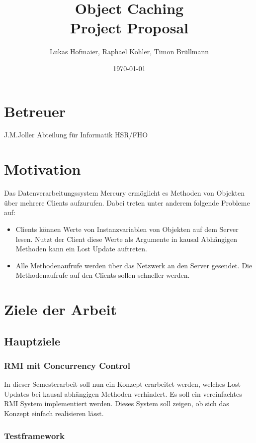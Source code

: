\documentclass{article}
\title{Object Caching\\Project Proposal}
\author{Lukas Hofmaier, Raphael Kohler, Timon Brüllmann}
\date{\today}
\begin{document}
\maketitle
\section{Betreuer}
J.M.Joller  Abteilung für Informatik HSR/FHO

\section{Motivation}
Das Datenverarbeitungssystem Mercury ermöglicht es Methoden von Objekten über mehrere Clients aufzurufen. Dabei treten unter anderem folgende Probleme auf:

\begin{itemize}
\item Clients können Werte von Instanzvariablen von Objekten auf dem Server lesen. Nutzt der Client diese Werte als Argumente in kausal Abhängigen Methoden kann ein Lost Update auftreten.
\item Alle Methodenaufrufe werden über das Netzwerk an den Server gesendet. Die Methodenaufrufe auf den Clients sollen schneller werden.
\end{itemize}

\section{Ziele der Arbeit}

\subsection{Hauptziele}
\label{sec:hauptziele}

\subsubsection{RMI mit Concurrency Control}
\label{sec:rmi-mit-concurrency}

In dieser Semesterarbeit soll nun ein Konzept erarbeitet werden, welches Lost Updates bei kausal abhängigen Methoden verhindert.  Es soll ein vereinfachtes RMI System implementiert werden. Dieses System soll zeigen, ob sich das Konzept einfach realisieren lässt.

\subsubsection{Testframework}
\label{sec:testframework}
\end{document}
